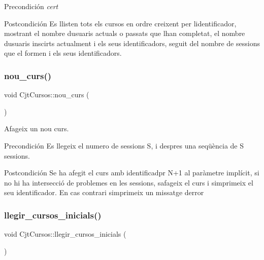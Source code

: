 \begin{DoxyPrecond}{Precondición}
{\itshape cert} 
\end{DoxyPrecond}
\begin{DoxyPostcond}{Postcondición}
Es llisten tots els cursos en ordre creixent per l\textquotesingle{}identificador, mostrant el nombre d\textquotesingle{}usuaris actuals o passats que l\textquotesingle{}han completat, el nombre d\textquotesingle{}usuaris inscirts actualment i els seus identificadors, seguit del nombre de sessions que el formen i els seus identificadors. 
\end{DoxyPostcond}
\mbox{\label{class_cjt_cursos_a3d4778b4572a99e1109d6376f439255e}} 
\subsubsection{\texorpdfstring{nou\+\_\+curs()}{nou\_curs()}}
{\footnotesize\ttfamily void Cjt\+Cursos\+::nou\+\_\+curs (\begin{DoxyParamCaption}{ }\end{DoxyParamCaption})}



Afageix un nou curs. 

\begin{DoxyPrecond}{Precondición}
Es llegeix el numero de sessions S, i despres una seqüència de S sessions. 
\end{DoxyPrecond}
\begin{DoxyPostcond}{Postcondición}
Se ha afegit el curs amb identificadpr N+1 al paràmetre implícit, si no hi ha intersecció de problemes en les sessions, s\textquotesingle{}afageix el curs i s\textquotesingle{}imprimeix el seu identificador. En cas contrari s\textquotesingle{}imprimeix un missatge d\textquotesingle{}error 
\end{DoxyPostcond}
\mbox{\label{class_cjt_cursos_a970aa3d7caa26ed983ccd71e4bfd0adf}} 
\subsubsection{\texorpdfstring{llegir\+\_\+cursos\+\_\+inicials()}{llegir\_cursos\_inicials()}}
{\footnotesize\ttfamily void Cjt\+Cursos\+::llegir\+\_\+cursos\+\_\+inicials (\begin{DoxyParamCaption}{ }\end{DoxyParamCaption})}




